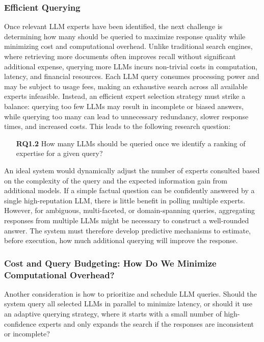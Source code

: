 \subsubsection{Efficient Querying}

Once relevant LLM experts have been identified, the next challenge is determining how many should be queried to maximize response quality while minimizing cost and computational overhead. Unlike traditional search engines, where retrieving more documents often improves recall without significant additional expense, querying more LLMs incurs non-trivial costs in computation, latency, and financial resources. Each LLM query consumes processing power and may be subject to usage fees, making an exhaustive search across all available experts infeasible. Instead, an efficient expert selection strategy must strike a balance: querying too few LLMs may result in incomplete or biased answers, while querying too many can lead to unnecessary redundancy, slower response times, and increased costs. This leads to the following research question:

\begin{itemize}
    \item [\textbf{RQ1.2}] How many LLMs should be queried once we identify a ranking of expertise for a given query?
\end{itemize}

An ideal system would dynamically adjust the number of experts consulted based on the complexity of the query and the expected information gain from additional models. If a simple factual question can be confidently answered by a single high-reputation LLM, there is little benefit in polling multiple experts. However, for ambiguous, multi-faceted, or domain-spanning queries, aggregating responses from multiple LLMs might be necessary to construct a well-rounded answer. The system must therefore develop predictive mechanisms to estimate, before execution, how much additional querying will improve the response. 

\subsubsection{Cost and Query Budgeting: How Do We Minimize Computational Overhead?}

Another consideration is how to prioritize and schedule LLM queries. Should the system query all selected LLMs in parallel to minimize latency, or should it use an adaptive querying strategy, where it starts with a small number of high-confidence experts and only expands the search if the responses are inconsistent or incomplete? 

